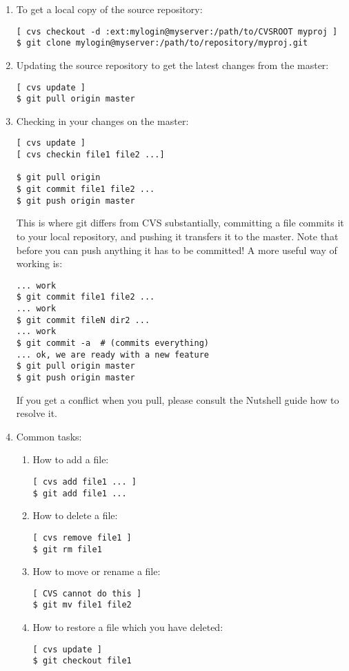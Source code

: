 \documentclass[a4paper,10pt]{article}
\begin{document}
\begin{enumerate}
\item To get a local copy of the source repository:
\begin{verbatim}
[ cvs checkout -d :ext:mylogin@myserver:/path/to/CVSROOT myproj ]
$ git clone mylogin@myserver:/path/to/repository/myproj.git 
\end{verbatim}

\item Updating the source repository to get the latest changes from the
master:
\begin{verbatim}
[ cvs update ]
$ git pull origin master
\end{verbatim}

\item Checking in your changes on the master:
\begin{verbatim}
[ cvs update ]
[ cvs checkin file1 file2 ...]

$ git pull origin
$ git commit file1 file2 ...
$ git push origin master
\end{verbatim}

This is where git differs from CVS substantially, committing a file
commits it to your local repository, and pushing it transfers it to the
master. Note that before you can push anything it has to be committed! 
A more useful way of working is:
\begin{verbatim}
... work
$ git commit file1 file2 ...
... work
$ git commit fileN dir2 ... 
... work
$ git commit -a  # (commits everything)
... ok, we are ready with a new feature
$ git pull origin master
$ git push origin master 
\end{verbatim}

If you get a conflict when you pull, please consult the Nutshell guide
how to resolve it.

\item Common tasks:
\begin{enumerate}
  \item How to add a file:
\begin{verbatim}
[ cvs add file1 ... ]
$ git add file1 ...
\end{verbatim}

\item How to delete a file:
\begin{verbatim}
[ cvs remove file1 ]
$ git rm file1 
\end{verbatim}

\item How to move or rename a file:
\begin{verbatim}
[ CVS cannot do this ]
$ git mv file1 file2
\end{verbatim}

\item How to restore a file which you have deleted:
\begin{verbatim}
[ cvs update ]
$ git checkout file1 
\end{verbatim}
\end{enumerate}
\end{enumerate}
\end{document}
